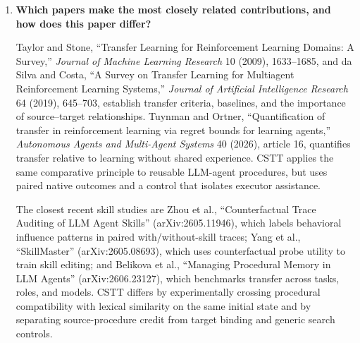 \documentclass[10pt]{article}
\begin{document}
\begin{enumerate}
The procedurally matched but lexically far condition succeeds in 176/180 blocks
(97.8\%), compared with 18/180 (10.0\%) for the lexically near procedural lure.
The paired gain is 87.8 percentage points, with a target-stratified 95\%
bootstrap interval of 82.8--93.3 points and a task-clustered randomization
$p=1.00\times10^{-6}$. Relative to the fair binding-only control, matched-far
produces 150 helpful and zero harmful discordances, an 83.3-point net gain. The
primary effect is 88.3, 88.3, and 86.7 points in the three model families and
positive in all six task families. Independent audits accept all 1,080 episodes
and 46,662 native turns with exact within-block initial-state matching, valid
native actions, valid source assignments, and no target-plan leakage.

The claim is deliberately bounded. The confirmation covers instance-level
transfer in one embodied text environment and three small-to-medium open
models. It does not establish universal retrieval quality, cross-domain
transfer, or benefits for proprietary frontier models.

\item \textbf{Which papers make the most closely related contributions, and
how does this paper differ?}

Taylor and Stone, ``Transfer Learning for Reinforcement Learning Domains: A
Survey,'' \emph{Journal of Machine Learning Research} 10 (2009), 1633--1685,
and da Silva and Costa, ``A Survey on Transfer Learning for Multiagent
Reinforcement Learning Systems,'' \emph{Journal of Artificial Intelligence
Research} 64 (2019), 645--703, establish transfer criteria, baselines, and the
importance of source--target relationships. Tuynman and Ortner,
``Quantification of transfer in reinforcement learning via regret bounds for
learning agents,'' \emph{Autonomous Agents and Multi-Agent Systems} 40 (2026),
article 16, quantifies transfer relative to learning without shared experience.
CSTT applies the same comparative principle to reusable LLM-agent procedures,
but uses paired native outcomes and a control that isolates executor assistance.

The closest recent skill studies are Zhou et al., ``Counterfactual Trace
Auditing of LLM Agent Skills'' (arXiv:2605.11946), which labels behavioral
influence patterns in paired with/without-skill traces; Yang et al.,
``SkillMaster'' (arXiv:2605.08693), which uses counterfactual probe utility to
train skill editing; and Belikova et al., ``Managing Procedural Memory in LLM
Agents'' (arXiv:2606.23127), which benchmarks transfer across tasks, roles, and
models. CSTT differs by experimentally crossing procedural compatibility with
lexical similarity on the same initial state and by separating source-procedure
credit from target binding and generic search controls.


\end{enumerate}
\end{document}
